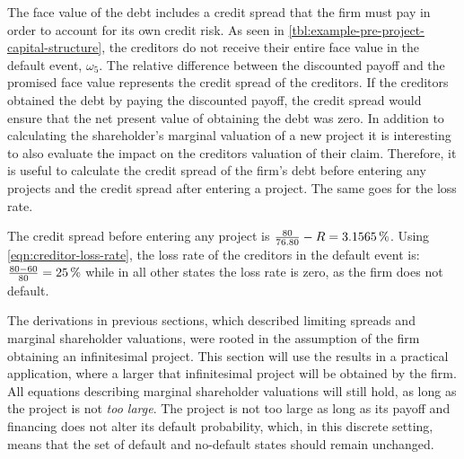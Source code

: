 \documentclass[main.tex]{subfiles}
\begin{document}
    The face value of the debt includes a credit spread that the firm must pay in order to account for its own credit risk.
    As seen in \cref{tbl:example-pre-project-capital-structure},
    the creditors do not receive their entire face value in the default event, $\omega_5$.
    The relative difference between the discounted payoff and the promised face value
    represents the credit spread of the creditors.
    If the creditors obtained the debt by paying the discounted payoff,
    the credit spread would ensure that the net present value of obtaining the debt was zero.
    In addition to calculating the shareholder's marginal valuation of a new project
    it is interesting to also evaluate the impact on the creditors valuation of their claim. 
    Therefore, it is useful to calculate the credit spread of the firm's debt 
    before entering any projects and the credit spread after entering a project.
    The same goes for the loss rate.

    The credit spread before entering any project is $\frac{\num{80}}{\num{76.80}} - \grossrfrate = \pct{0.031565}$.
    Using \cref{eqn:creditor-loss-rate}, the loss rate of the creditors in the default event is:
    $\frac{\num{80}-\num{60}}{\num{80}} = \pct{0.25}$
    while in all other states the loss rate is zero, as the firm does not default.

    The derivations in previous sections, 
    which described limiting spreads and marginal shareholder valuations, 
    were rooted in the assumption of the firm obtaining an infinitesimal project.
    This section will use the results in a practical application,
    where a larger that infinitesimal project will be obtained by the firm.
    All equations describing marginal shareholder valuations will still hold,
    as long as the project is not \textit{too large}.
    The project is not too large as long as its payoff and financing does not 
    alter its default probability, which, in this discrete setting, means
    that the set of default and no-default states should remain unchanged.
    
\end{document}
